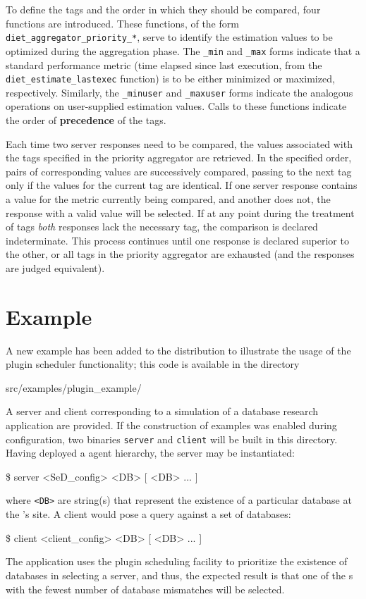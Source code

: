 To define the tags and the order in which they should be compared, four
functions are introduced.  These functions, of the form
\texttt{diet\_aggregator\_priority\_*}, serve to identify the estimation values
to be optimized during the aggregation phase.  The \texttt{\_min} and
\texttt{\_max} forms indicate that a standard performance metric (\eg time
elapsed since last execution, from the \texttt{diet\_estimate\_lastexec}
function) is to be either minimized or maximized, respectively.  Similarly, the
\texttt{\_minuser} and \texttt{\_maxuser} forms indicate the analogous
operations on user-supplied estimation values.  Calls to these functions
indicate the order of \textbf{precedence} of the tags.

Each time two server responses need to be compared, the values associated with
the tags specified in the priority aggregator are retrieved. In the specified
order, pairs of corresponding values are successively compared, passing to the
next tag only if the values for the current tag are identical. If one server
response contains a value for the metric currently being compared, and another
does not, the response with a valid value will be selected. If at any point
during the treatment of tags \emph{both} responses lack the necessary tag, the
comparison is declared indeterminate.  This process continues until one
response is declared superior to the other, or all tags in the priority
aggregator are exhausted (and the responses are judged equivalent).


\section{Example}

A new example has been added to the \diet distribution to illustrate the usage
of the plugin scheduler functionality; this code is available in the directory
\begin{code}
src/examples/plugin\_example/
\end{code}
A \diet server and client corresponding to a simulation of a database research
application are provided. If the construction of examples was enabled during
\diet configuration, two binaries \texttt{server} and \texttt{client} will be
built in this directory. Having deployed a \diet agent hierarchy, the server
may be instantiated:
\begin{code}
  \$ server <SeD\_config> <DB> [ <DB> ... ]
\end{code}
where \texttt{<DB>} are string(s) that represent the existence of a particular
database at the {\sed}'s site.  A client would pose a query against a set of
databases:
\begin{code}
  \$ client <client\_config> <DB> [ <DB> ... ]
\end{code}
The application uses the plugin scheduling facility to prioritize the existence
of databases in selecting a server, and thus, the expected result is that one
of the {\sed}s with the fewest number of database mismatches will be selected.

